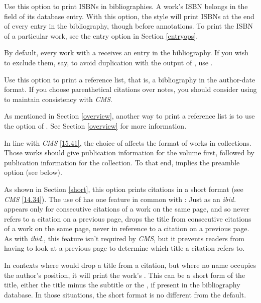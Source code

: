 \documentclass[11pt,letterpaper,oneside]{article}
\begin{document}
\begin{optionlist}

\noindent Use this option to print ISBNs in bibliographies. A work's
ISBN belongs in the  field of its database entry. With
this option, the style will print ISBNs at the end of every entry in
the bibliography, though before annotations. To print the ISBN of a
particular work, see the  entry option in Section
\ref{entryops}.


\noindent By default, every work with a  receives
an entry in the bibliography. If you wish to exclude them, say, to
avoid duplication with the output of , use
.


\noindent Use this option to print a reference list, that is, a
bibliography in the author-date format. If you choose parenthetical
citations over notes, you should consider using  to
maintain consistency with \textit{CMS}.

As mentioned in Section \ref{overview}, another way to print a
reference list is to use the   option of
. See Section \ref{overview} for more
information.

In line with \textit{CMS} \ref{15.41}, the choice of 
affects the format of works in collections. Those works should give
publication information for the volume first, followed by publication
information for the collection. To that end,  implies the
preamble option  (see below).


\noindent As shown in Section \ref{short}, this option prints
citations in a short format (see \textit{CMS} \ref{14.34}). The use of
 has one feature in common with : Just as an
\textit{ibid.} appears only for consecutive citations of a work on the
same page, and so never refers to a citation on a previous page,
 drops the title from consecutive citations of a work on
the same page, never in reference to a citation on a previous page. As
with \textit{ibid.}, this feature isn't required by \textit{CMS}, but
it prevents readers from having to look at a previous page to
determine which title a citation refers to.

In contexts where  would drop a title from a citation, but
where no name occupies the author's position, it will print the work's
. This can be a short form of the title, either
the title minus the subtitle or the , if present
in the bibliography database. In those situations, the short format is
no different from the default.


\end{optionlist}
\end{document}
